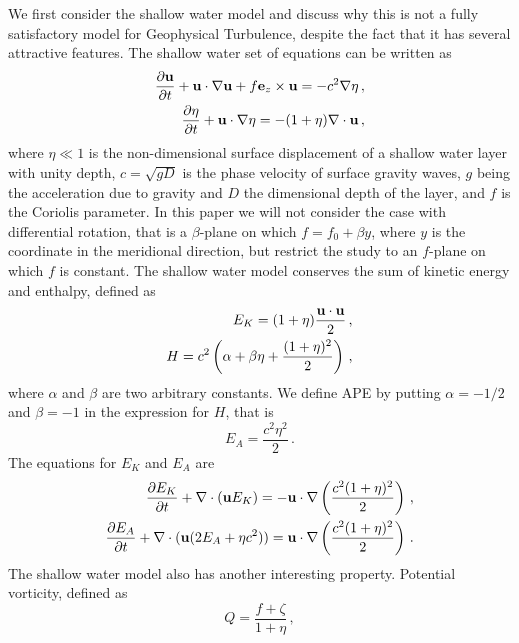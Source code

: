 We first consider the shallow water model \citep{Vallis:book} and discuss why this  is not a fully satisfactory model for Geophysical Turbulence, despite the fact that it has several attractive features. The shallow water set of equations can be written as
\begin{eqnarray} \label{Velocity}
\frac{\partial {\bf u}} {\partial t} + {\bf u} \cdot \nabla {\bf u} +  f {\bf e}_z \times {\bf u} = -c^2 \nabla \eta \, , \\ \label {Eta}
\frac{\partial \eta}{\partial t}
+ {\bf u} \cdot \nabla \eta   = - (1+\eta) \nabla \cdot {\bf u} \, ,
\end{eqnarray}
where $ \eta \ll 1 $ is the non-dimensional surface displacement of a shallow water layer with unity depth, $ c = \sqrt{gD} $ is the phase velocity of surface gravity waves, $ g $ being the acceleration due to gravity and $ D $ the dimensional depth of the layer, and $ f  $ is the Coriolis parameter. In this paper we will not consider the case with differential rotation, that is a $ \beta $-plane on which $ f = f_{0} + \beta y $, where  $ y $ is the coordinate in the meridional direction, but restrict the study to an $ f $-plane on which $ f $ is constant.
The shallow water model conserves the sum of kinetic energy and enthalpy, defined as
\begin{eqnarray}
E_K = (1+\eta) \frac{{\bf u} \cdot {\bf u}}{2} \, , \\  \label{potential}
H = c^{2} \left (\alpha + \beta \eta  + \frac{(1+\eta)^2 }{2} \right) \, ,
\end{eqnarray}
where $ \alpha $ and $ \beta $ are two arbitrary constants.
We define APE by putting $  \alpha = -1/2 $ and $ \beta = - 1 $  in the expression for $ H $, that is
 \begin{equation}
E_{A} = \frac{c^2  \eta^{2} }{2} \, .
\end{equation}
The equations for $ E_K $ and $ E_A $ are
\begin{eqnarray} \label{KE}
\frac{\partial{E_K}} {\partial t} + \nabla \cdot ({\bf u}E_K) = -{\bf u} \cdot \nabla \left (\frac{c^2(1+\eta)^2}{2} \right ) \, , \\
\frac{\partial{E_A}} {\partial t} + \nabla \cdot({\bf u} (2E_A + \eta c^{2})) = {\bf u} \cdot \nabla \left (\frac{c^2(1+\eta)^2}{2} \right ) \, .
\end{eqnarray}
The shallow water model also has another interesting property. Potential vorticity, defined as
\begin{equation} \label{PV}
Q = \frac{f +\zeta }{1+\eta} \, ,
\end{equation}
